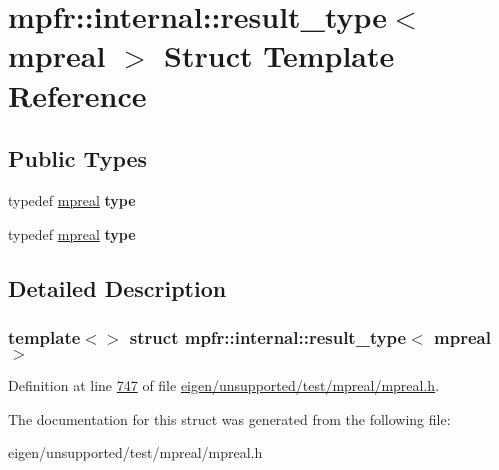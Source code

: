 \hypertarget{structmpfr_1_1internal_1_1result__type_3_01mpreal_01_4}{}\section{mpfr\+:\+:internal\+:\+:result\+\_\+type$<$ mpreal $>$ Struct Template Reference}
\label{structmpfr_1_1internal_1_1result__type_3_01mpreal_01_4}
\subsection*{Public Types}
\begin{DoxyCompactItemize}
\item 
\mbox{\label{structmpfr_1_1internal_1_1result__type_3_01mpreal_01_4_a93829229088337909346602fe503bbb0}} 
typedef \hyperlink{classmpfr_1_1mpreal}{mpreal} {\bfseries type}
\item 
\mbox{\label{structmpfr_1_1internal_1_1result__type_3_01mpreal_01_4_a93829229088337909346602fe503bbb0}} 
typedef \hyperlink{classmpfr_1_1mpreal}{mpreal} {\bfseries type}
\end{DoxyCompactItemize}


\subsection{Detailed Description}
\subsubsection*{template$<$$>$\newline
struct mpfr\+::internal\+::result\+\_\+type$<$ mpreal $>$}



Definition at line \hyperlink{eigen_2unsupported_2test_2mpreal_2mpreal_8h_source_l00747}{747} of file \hyperlink{eigen_2unsupported_2test_2mpreal_2mpreal_8h_source}{eigen/unsupported/test/mpreal/mpreal.\+h}.



The documentation for this struct was generated from the following file\+:\begin{DoxyCompactItemize}
\item 
eigen/unsupported/test/mpreal/mpreal.\+h\end{DoxyCompactItemize}
